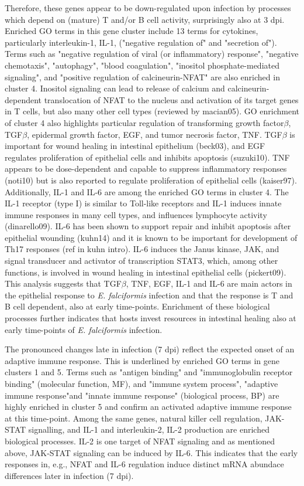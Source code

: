 \documentclass{bmcart}
\begin{document}
 Therefore, these genes appear to be down-regulated upon infection by processes which depend on (mature) T and/or B cell activity, surprisingly also at 3 dpi. Enriched GO terms in this gene cluster include 13 terms for cytokines, particularly interleukin-1, IL-1, ("negative regulation of" and "secretion of"). Terms such as "negative regulation of viral (or inflammatory) response", "negative chemotaxis", "autophagy", "blood coagulation", "inositol phosphate-mediated signaling", and "positive regulation of calcineurin-NFAT" are also enriched in cluster 4. Inositol signaling can lead to release of calcium and calcineurin-dependent translocation of NFAT to the nucleus and activation of its target genes in T cells, but also many other cell types (reviewed by macian05). GO enrichment of cluster 4 also highlights particular regulation of transforming growth factor$\beta$, TGF$\beta$, epidermal growth factor, EGF, and tumor necrosis factor, TNF. TGF$\beta$ is important for wound healing in intestinal epithelium (beck03), and EGF regulates proliferation of epithelial cells and inhibits apoptosis (suzuki10). TNF appears to be dose-dependent and capable to suppress inflammatory responses (noti10) but is also reported to regulate proliferation of epithelial cells (kaiser97). Additionally, IL-1 and IL-6 are among the enriched GO terms in cluster 4. The IL-1 receptor (type I) is similar to Toll-like receptors and IL-1 induces innate immune responses in many cell types, and influences lymphocyte activity (dinarello09). IL-6 has been shown to support repair and inhibit apoptosis after epithelial wounding (kuhn14) and it is known to be important for development of Th17 responses (ref in kuhn intro). 
IL-6 induces the Janus kinase, JAK, and signal transducer and activator of transcription STAT3, which, among other functions, is involved in wound healing in intestinal epithelial cells (pickert09). This analysis suggests that TGF$\beta$, TNF, EGF, IL-1 and IL-6 are main actors in the epithelial response to \textit{E. falciformis} infection and that the response is T and B cell dependent, also at early time-points. Enrichment of these biological processes further indicates that hosts invest resources in intestinal healing also at early time-points of \textit{E. falciformis} infection.
 
The pronounced changes late in infection (7 dpi) reflect the expected onset of an adaptive immune response. This is underlined by enriched GO terms in gene clusters 1 and 5. Terms such as "antigen binding" and "immunoglobulin receptor binding" (molecular function, MF), and "immune system process", "adaptive immune response"and "innate immune response" (biological process, BP) are highly enriched in cluster 5 and confirm an activated adaptive immune response at this time-point. Among the same genes, natural killer cell regulation, JAK-STAT signalling, and IL-1 and interleukin-2, IL-2 production are enriched biological processes. IL-2 is one target of NFAT signaling and as mentioned above, JAK-STAT signaling can be induced by IL-6. This indicates that the early responses in, e.g., NFAT and IL-6 regulation induce distinct mRNA abundace differences later in infection (7 dpi).  
\end{document}
